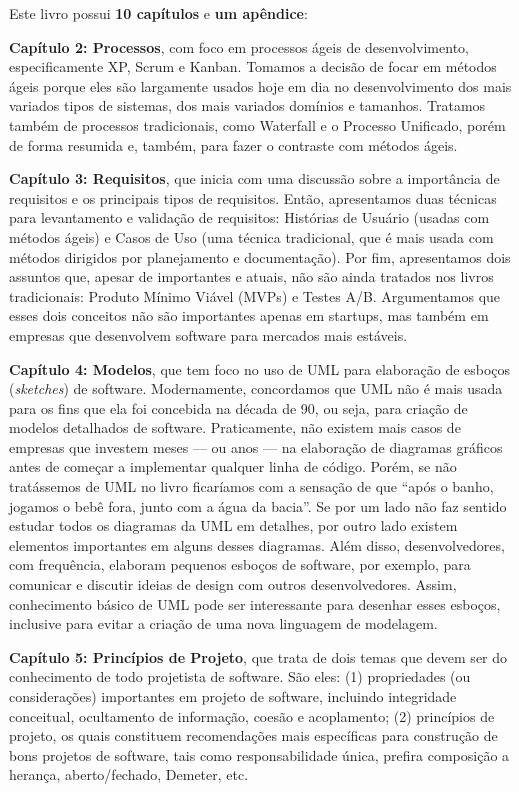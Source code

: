 \documentclass[
  11pt,
  twoside]{book}
\begin{document}
Este livro possui \textbf{10 capítulos} e \textbf{um apêndice}:

\textbf{Capítulo 2: Processos}, com foco em processos ágeis de
desenvolvimento, especificamente XP, Scrum e Kanban. Tomamos a decisão
de focar em métodos ágeis porque eles são largamente usados hoje em dia
no desenvolvimento dos mais variados tipos de sistemas, dos mais
variados domínios e tamanhos. Tratamos também de processos tradicionais,
como Waterfall e o Processo Unificado, porém de forma resumida e,
também, para fazer o contraste com métodos ágeis.

\textbf{Capítulo 3: Requisitos}, que inicia com uma discussão sobre a
importância de requisitos e os principais tipos de requisitos. Então,
apresentamos duas técnicas para levantamento e validação de requisitos:
Histórias de Usuário (usadas com métodos ágeis) e Casos de Uso (uma
técnica tradicional, que é mais usada com métodos dirigidos por
planejamento e documentação). Por fim, apresentamos dois assuntos que,
apesar de importantes e atuais, não são ainda tratados nos livros
tradicionais: Produto Mínimo Viável (MVPs) e Testes A/B. Argumentamos
que esses dois conceitos não são importantes apenas em startups, mas
também em empresas que desenvolvem software para mercados mais estáveis.

\textbf{Capítulo 4: Modelos}, que tem foco no uso de UML para elaboração
de esboços (\emph{sketches}) de software. Modernamente, concordamos que
UML não é mais usada para os fins que ela foi concebida na década de 90,
ou seja, para criação de modelos detalhados de software. Praticamente,
não existem mais casos de empresas que investem meses --- ou anos --- na
elaboração de diagramas gráficos antes de começar a implementar qualquer
linha de código. Porém, se não tratássemos de UML no livro ficaríamos
com a sensação de que ``após o banho, jogamos o bebê fora, junto com a
água da bacia''. Se por um lado não faz sentido estudar todos os
diagramas da UML em detalhes, por outro lado existem elementos
importantes em alguns desses diagramas. Além disso, desenvolvedores, com
frequência, elaboram pequenos esboços de software, por exemplo, para
comunicar e discutir ideias de design com outros desenvolvedores. Assim,
conhecimento básico de UML pode ser interessante para desenhar esses
esboços, inclusive para evitar a criação de uma nova linguagem de
modelagem.

\textbf{Capítulo 5: Princípios de Projeto}, que trata de dois temas que
devem ser do conhecimento de todo projetista de software. São eles: (1)
propriedades (ou considerações) importantes em projeto de software,
incluindo integridade conceitual, ocultamento de informação, coesão e
acoplamento; (2) princípios de projeto, os quais constituem
recomendações mais específicas para construção de bons projetos de
software, tais como responsabilidade única, prefira composição a
herança, aberto/fechado, Demeter, etc.
\end{document}
